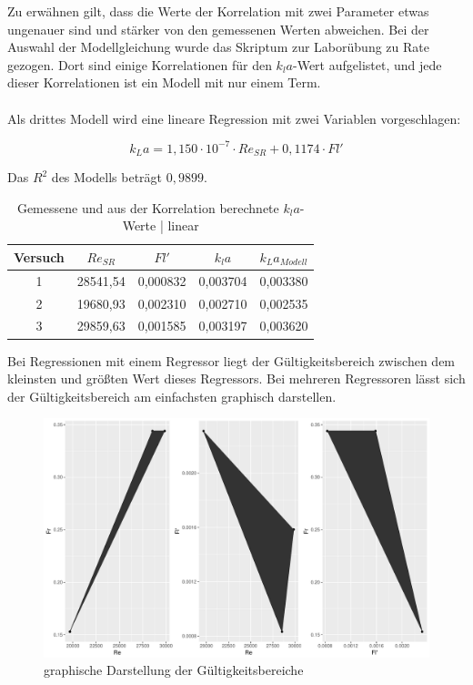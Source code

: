 \documentclass[12pt,liststotoc]{report}
\begin{document}
Zu erwähnen gilt, dass die Werte der Korrelation mit zwei Parameter etwas ungenauer sind und stärker von den gemessenen Werten abweichen. Bei der Auswahl der Modellgleichung wurde das Skriptum zur Laborübung \cite{Labor_Skript} zu Rate gezogen. Dort sind einige Korrelationen für den $k_la$-Wert aufgelistet, und jede dieser Korrelationen ist ein Modell mit nur einem Term.\\
\\
Als drittes Modell wird eine lineare Regression mit zwei Variablen vorgeschlagen:

\begin{equation}
    k_La = 1,150 \cdot 10^{-7} \cdot Re_{SR} + 0,1174 \cdot Fl'
\end{equation}

Das $R^2$ des Modells beträgt $0,9899$.

\begin{table}[H]
  \centering
  \caption{Gemessene und aus der Korrelation berechnete $k_la$-Werte | linear}
    \begin{tabular}{ccccc}
    \toprule
    Versuch & $Re_{SR}$ & $Fl'$ & $k_la$ & $k_La_{Modell}$ \\
    \midrule
    1     & 28541,54 & 0,000832 & 0,003704 & 0,003380 \\
    2     & 19680,93 & 0,002310 & 0,002710 & 0,002535 \\
    3     & 29859,63 & 0,001585 & 0,003197 & 0,003620 \\
    \bottomrule
    \end{tabular}%
  \label{tab:korrelation-lin}%
\end{table}%

Bei Regressionen mit einem Regressor liegt der Gültigkeitsbereich zwischen dem kleinsten und größten Wert dieses Regressors. Bei mehreren Regressoren lässt sich der Gültigkeitsbereich am einfachsten graphisch darstellen.

\begin{figure}[H]
    \centering
    \includegraphics[width=1\textwidth]{Graphics/gueltigkeit.pdf}
    \caption[Gültigkeitsbereiche]{graphische Darstellung der Gültigkeitsbereiche}
    \label{fig:gueltigkeit}
\end{figure}
\end{document}
